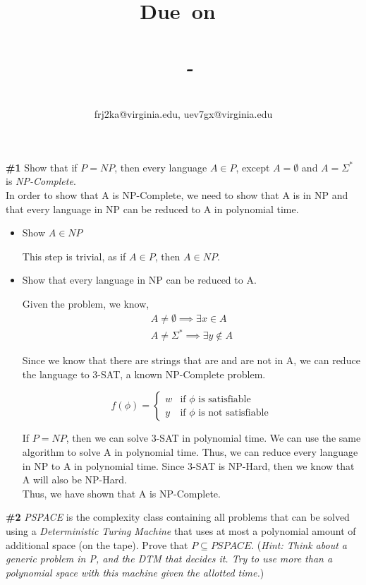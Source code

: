 \documentclass{article}
\title{
    \vspace{2in}
    \textmd{\textbf{\hmwkTitle}}\\
    \normalsize\vspace{0.1in}
    \small{\textbf{Due\ on\ \hmwkDueDate}}\\
    \normalsize\text{Tuesday/Thursday 11:00-12:15, Warner 209}\\
    \vspace{0.1in}\large{\textit{\hmwkClassInstructor\ - \hmwkClassTime}}
    \vspace{3in}
}
\author{\hmwkAuthorName\\\small{frj2ka@virginia.edu, uev7gx@virginia.edu}}
\date{}
\newcommand{\problem}[1]{\textbf{\##1}}
\begin{document}
\maketitle

\pagebreak

\problem{1} Show that if $P = NP$, then every language $A \in P$, except $A = \emptyset$ and $A = \Sigma^*$ is \emph{NP-Complete}.\\

In order to show that A is NP-Complete, we need to show that A is in NP and that every language in NP can be reduced to A in polynomial time.

\begin{itemize}
    \item Show $A \in NP$
    
    This step is trivial, as if $A \in P$, then $A \in NP$.

    \item Show that every language in NP can be reduced to A.
    
    Given the problem, we know,
    \begin{align}
        A \neq \emptyset \implies \exists x \in A \\
        A \neq \Sigma^* \implies \exists y \notin A
    \end{align}

    Since we know that there are strings that are and are not in A, we can reduce the language to 3-SAT, a known NP-Complete problem.

    $$f(\phi) = \begin{cases}
        w & \text{if } \phi \text{ is satisfiable} \\
        y & \text{if } \phi \text{ is not satisfiable}
    \end{cases}$$

    If $P=NP$, then we can solve 3-SAT in polynomial time. We can use the same algorithm to solve A in polynomial time. Thus, we can reduce every language in NP to A in polynomial time. Since 3-SAT is NP-Hard, then we know that A will also be NP-Hard.\\
    
    Thus, we have shown that A is NP-Complete.
\end{itemize}

\pagebreak

\problem{2} \emph{PSPACE} is the complexity class containing all problems that can be solved using a \emph{Deterministic Turing Machine} that uses at most a polynomial amount of additional space (on the tape). Prove that $P \subseteq \textit{PSPACE}$. (\emph{Hint: Think about a generic problem in P, and the DTM that decides it. Try to use more than a polynomial space with this machine given the allotted time.})\\
\end{document}
